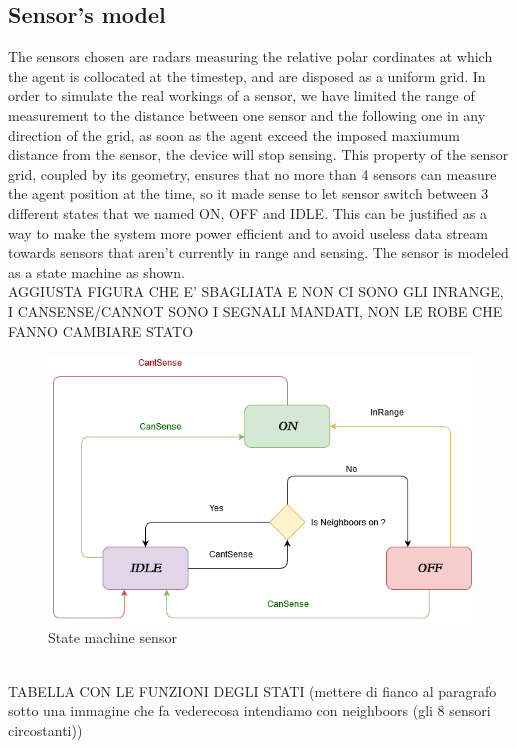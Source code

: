 \documentclass{article}
\begin{document}
\begin{multicols}{2}
    \subsection*{Sensor's model}
    The sensors chosen are radars measuring the relative polar cordinates at which the agent is collocated at the timestep, and
    are disposed as a uniform grid. In order to simulate the real workings of a sensor, we have limited the range of measurement to the distance
    between one sensor and the following one in any direction of the grid, as soon as the agent exceed the imposed maxiumum distance from the sensor,
    the device will stop sensing.
    This property of the sensor grid, coupled by its geometry, ensures that no more than 4 sensors can measure the agent position at the time,
    so it made sense to let sensor switch between 3 different states that we named ON, OFF and IDLE. This can be justified as a way to make the system
    more power efficient and to avoid useless data stream towards sensors that aren't currently in range and sensing.
    The sensor is modeled as a state machine as shown.
    \\
    AGGIUSTA FIGURA CHE E' SBAGLIATA E NON CI SONO GLI INRANGE, I CANSENSE/CANNOT SONO I SEGNALI MANDATI, NON LE ROBE CHE FANNO CAMBIARE STATO 
    \begin{figure}[h!]
        \centering
        \includegraphics[scale=0.05]{UntitledDiagram.png}
        \caption{State machine sensor}
        \label{fig:galaxy}
    \end{figure}
    \\
    TABELLA CON LE FUNZIONI DEGLI STATI (mettere di fianco al paragrafo sotto una immagine che fa  vederecosa intendiamo con neighboors (gli 8 
    sensori circostanti))
    \\

\end{multicols}
\end{document}

